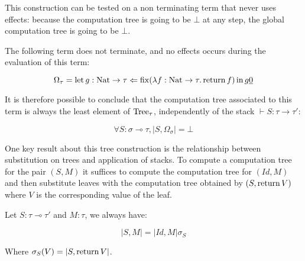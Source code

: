 This construction can be tested on a non terminating term 
that never uses effects:
because the computation tree is going to be $\bot$ at any 
step, the global computation tree is going to be $\bot$.


\begin{example}
    The following term does not terminate, and no effects occurs 
    during the evaluation of this term:
    
    \begin{equation*}
        \Omega_\tau = \Bind{\Fix (\lambda f : \Nat \to \tau. \Ret f
        )}{g : \Nat \to \tau}{g \underline{0}}
    \end{equation*}

    It is therefore possible to conclude that the computation tree
    associated to this term is always the least element of $\Tree_\tau$,
    independently of the stack $\vdash S : \tau \to \tau'$:

    \begin{equation*}
        \forall S : \sigma \multimap \tau, |S, \Omega_\sigma| = \bot
    \end{equation*}
\end{example}


One key result about this tree construction is the relationship between 
substitution on trees and application of stacks. To compute a computation 
tree for the pair $(S,M)$ it suffices to compute the computation tree 
for $(Id,M)$ and then substitute leaves with the computation tree obtained 
by $(S,\Ret V)$ where $V$ is the corresponding value of the leaf.

\begin{alemma}
    \label{lem:stackcom}
    Let $S : \tau \multimap \tau'$ and $M : \tau$, we always have:

    \begin{equation*}
        |S, M| = |Id,M| \sigma_S
    \end{equation*}

    Where $\sigma_S (V) = |S, \Ret V|$.
\end{alemma}

